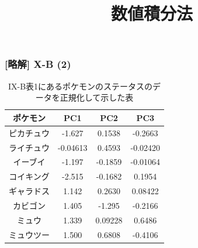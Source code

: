 \documentclass[dvipdfmx,aspectratio=169,20pt]{beamer}
\newcommand{\myfontsetting}[3]{{\fontsize{#1}{#2}\selectfont #3}}
\begin{document}
\begin{frame}
\frametitle{[略解] X-B (2)}

\myfontsetting{12pt}{12pt}{
\begin{table}[htbp]
    \centering
\begin{tabular}{|c||c|c|c|}
\hline
ポケモン & PC1 & PC2 & PC3\\
\hline
ピカチュウ	& -1.627   &  0.1538  &  -0.2663 \\
ライチュウ	& -0.04613 &  0.4593  &  -0.02420 \\
イーブイ	& -1.197   &  -0.1859 &  -0.01064 \\
コイキング	& -2.515   &  -0.1682 &  0.1954  \\
ギャラドス	&  1.142   &  0.2630  &  0.08422 \\
カビゴン	&  1.405   & -1.295   & -0.2166  \\
ミュウ		&  1.339   & 0.09228  & 0.6486  \\
ミュウツー	&  1.500   & 0.6808   & -0.4106 \\
\hline
\end{tabular}
\caption{\myfontsetting{10pt}{10pt}{
I\hspace{-.1em}X-B表1にあるポケモンのステータスのデータを正規化して示した表
}}
\end{table}
}

\end{frame}


\title{数値積分法}


\end{document}

